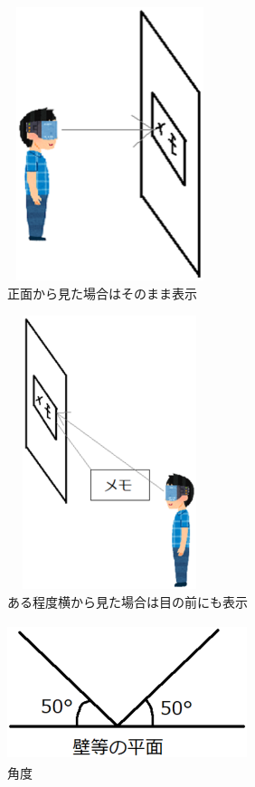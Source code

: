 \documentclass[11pt,a4j, titlepage]{jarticle} %
\begin{document}
\begin{figure}[H]
  \begin{center}
    \includegraphics[clip,height=8.0cm,width=6.0cm]{./shoumen.eps}
    \caption{正面から見た場合はそのまま表示}
    \label{fig:shoumen}
  \end{center}
\end{figure}

\begin{figure}[H]
  \begin{center}
    \includegraphics[clip,height=8.0cm,width=6.0cm]{./memo_wall.eps}
    \caption{ある程度横から見た場合は目の前にも表示}
    \label{fig:memo_wall}
  \end{center}
\end{figure}

\begin{figure}[H]
  \begin{center}
    \includegraphics[clip,height=4.0cm,width=7.0cm]{./kakudo.eps}
    \caption{角度}
    \label{fig:kakudo}
  \end{center}
\end{figure}
\end{document}
